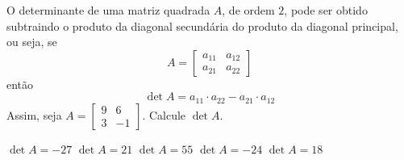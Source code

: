 O determinante de uma matriz quadrada $A$, de ordem $2$, pode ser obtido subtraindo o produto da diagonal secundária do produto da diagonal principal, ou seja, se
\[A = \left[ \begin{array}{cc}
a_{11}  &   a_{12}\\
a_{21}   & a_{22}
\end{array} \right]\]
então
\[\det A=a_{11}\cdot a_{22}-a_{21}\cdot a_{12}\]
Assim, seja $A = \left[ \begin{array}{cc}
9   &  6\\
3  &  -1
\end{array} \right]$. Calcule $\det A$.

$\det A=-27$
$\det A=21$
$\det A=55$
$\det A=-24$
$\det A=18$



